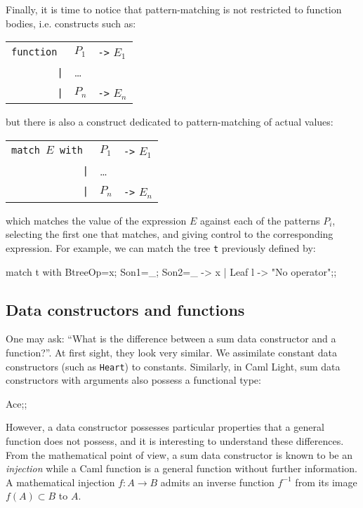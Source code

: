 Finally, it is time to notice that pattern-matching is not restricted to
function bodies, i.e. constructs such as:
\begin{center}
\begin{tabular}{rll}
\tt function & $P_1$ & \verb|->| $E_1$\\
    \verb'|' & \ldots\\
    \verb'|' & $P_n$ & \verb|->| $E_n$
\end{tabular}
\end{center}
but there is also a construct dedicated to pattern-matching of actual
values:
\begin{center}
\begin{tabular}{rll}
\tt match $E$ with & $P_1$ & \verb|->| $E_1$\\
          \verb'|' & \ldots\\
          \verb'|' & $P_n$ & \verb|->| $E_n$
\end{tabular}
\end{center}
which matches the value of the expression $E$ against each of the
patterns $P_i$, selecting the first one that matches, and giving
control to the corresponding expression. For example, we can match the
tree {\tt t} previously defined by:
\begin{caml_example}
match t with Btree{Op=x; Son1=_; Son2=_} -> x
           | Leaf l -> "No operator";;
\end{caml_example}

\subsection{Data constructors and functions}

One may ask: ``What is the difference between a sum data constructor and a
function?''.
At first sight, they look very similar. We assimilate constant data
constructors (such as {\tt Heart}) to constants. Similarly, in Caml
Light, sum data constructors with arguments also possess a functional type:
\begin{caml_example}
Ace;;
\end{caml_example}
However, a data constructor possesses particular properties
that a general function does not possess, and it is interesting to
understand these differences.  From the mathematical point of view, a
sum data constructor is known to be an {\em injection} while a Caml
function is a general function without further information.
A mathematical injection $f: A \rightarrow B$ admits an inverse function
$f^{-1}$ from its image $f(A) \subset B$ to $A$.

